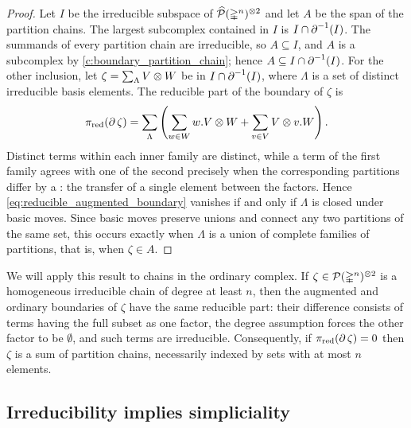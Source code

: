 \begin{proof}
	Let $I$ be the irreducible subspace of $\widehat{\mathcal{P}}(\mathbb{\Delta}^n)^{\otimes 2}$ and let $A$ be the span of the partition chains.
	The largest subcomplex contained in \(I\) is \(I \cap \operatorname{\partial}^{-1}(I)\).
	The summands of every partition chain are irreducible, so $A \subseteq I$, and $A$ is a subcomplex by \cref{c:boundary_partition_chain}; hence \(A \subseteq I \cap \operatorname{\partial}^{-1}(I)\).
	For the other inclusion,
	let $\zeta = \sum_\Lambda V \otimes W$ be in $I \cap \operatorname{\partial}^{-1}(I)$, where $\Lambda$ is a set of distinct irreducible basis elements.
	The reducible part of the boundary of $\zeta$ is
	\begin{equation}\label{eq:reducible_augmented_boundary}
		\operatorname{\pi_{\text{red}}}(\operatorname{\partial}\zeta) =
		\sum_\Lambda\left(
		\sum_{w \in W} w.V \otimes W +
		\sum_{v \in V} V \otimes v.W
		\right).
	\end{equation}
	Distinct terms within each inner family are distinct, while a term of the first family agrees with one of the second precisely when the corresponding partitions differ by a : the transfer of a single element between the factors.
	Hence \cref{eq:reducible_augmented_boundary} vanishes if and only if $\Lambda$ is closed under basic moves.
	Since basic moves preserve unions and connect any two partitions of the same set, this occurs exactly when $\Lambda$ is a union of complete families of partitions, that is, when $\zeta \in A$.
\end{proof}

We will apply this result to chains in the ordinary complex.
If $\zeta \in \mathcal{P}(\mathbb{\Delta}^n)^{\otimes 2}$ is a homogeneous irreducible chain of degree at least $n$, then the augmented and ordinary boundaries of $\zeta$ have the same reducible part: their difference consists of terms having the full subset as one factor, the degree assumption forces the other factor to be $\emptyset$, and such terms are irreducible.
Consequently, if $\operatorname{\pi_{\text{red}}}(\operatorname{\partial}\zeta) = 0$ then $\zeta$ is a sum of partition chains, necessarily indexed by sets with at most $n$ elements.

\subsection{Irreducibility implies simpliciality}

